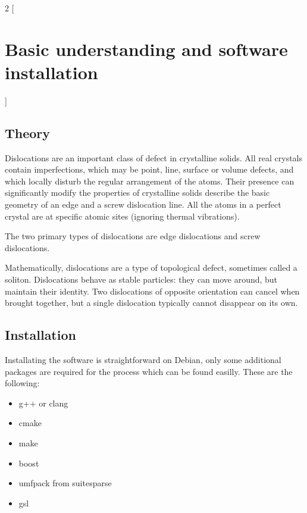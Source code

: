 \documentclass[12pt,a4paper]{article}
\theoremstyle{plain}
\begin{document}
\begin{multicols*}{2}
	[
		\section{Basic understanding and software installation}
		\vspace{0.1cm}
	]

	\subsection{Theory}

	Dislocations are an important class of
	defect in crystalline solids.
	All real crystals contain imperfections,
	which may be point, line, surface or
	volume defects, and which locally disturb
	the regular arrangement of the atoms.
	Their presence can significantly modify
	the properties of crystalline solids
	describe the basic geometry of an edge and
	a screw dislocation line. All the atoms in
	a perfect crystal are at specific atomic
	sites (ignoring thermal vibrations).

	\vspace{0.1cm}

	The two primary types of dislocations
	are edge dislocations and screw dislocations.

	\vspace{0.1cm}

	Mathematically, dislocations are a
	type of topological defect, sometimes
	called a soliton. Dislocations behave as
	stable particles: they can move around,
	but maintain their identity. Two dislocations
	of opposite orientation can cancel when
	brought together, but a single dislocation
	typically cannot disappear on its own.

	\subsection{Installation}

	\par Installating the software is straightforward on Debian, only some additional packages are required
	for the process which can be found easilly. These are the following:

	\begin{itemize}
		\item g++ or clang
		\item cmake
		\item make
		\item boost
		\item umfpack from suitesparse
		\item gsl
	\end{itemize}


\end{multicols*}
\end{document}
